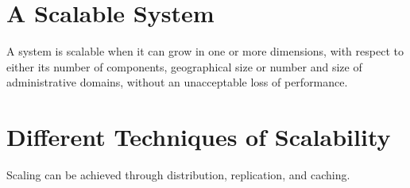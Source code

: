 \documentclass[11pt,a4paper]{article}
\begin{document}
	\section{A Scalable System}
	A system is scalable when it can grow in one or more dimensions, with respect to either its number of components, geographical size or number and size of administrative domains, without an unacceptable loss of performance.
	
	\section{Different Techniques of Scalability}
	Scaling can be achieved through distribution, replication, and caching.
	
\end{document}
